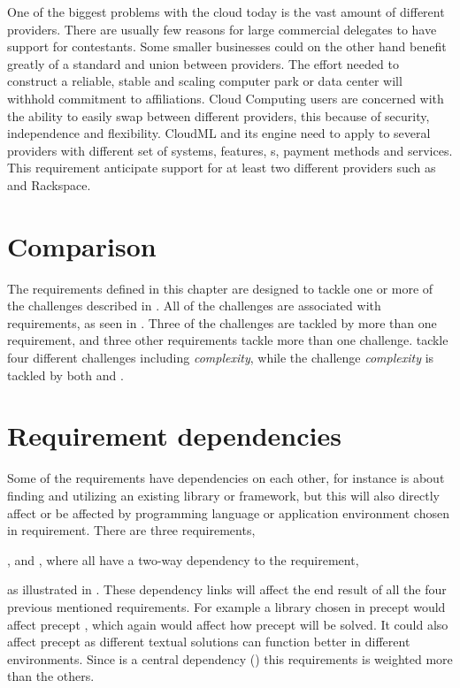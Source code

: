 One of the biggest problems with the cloud today is the vast amount of different providers. 
There are usually few reasons for large commercial delegates to have support for contestants. 
Some smaller businesses could on the other hand benefit greatly of a standard and union 
between providers.
The effort needed to construct a reliable, stable and scaling computer park or data center will 
withhold commitment to affiliations. 
Cloud Computing users are concerned with the ability to easily swap between different providers, 
this because of security, 
independence and flexibility. 
CloudML and its engine need to apply to several providers with different set of systems, 
features, s, payment methods and services. 
This requirement anticipate support for at least two different providers such as  and Rackspace.

\section{Comparison}


The requirements defined in this chapter are designed to tackle one or more of the challenges
described in .
All of the challenges are associated with requirements, as seen in .
Three of the challenges are tackled by more than one requirement, and three other requirements
tackle more than one challenge.
\eg {} tackle four different challenges including \emph{complexity},
while the challenge \emph{complexity} is tackled by both 
 and .

\section{Requirement dependencies}

Some of the requirements have dependencies on each other, for instance  is about finding
and utilizing an existing library or framework, but this will also directly affect or be affected by
programming language or application environment chosen in  requirement.
There are three requirements, 
\begin{ii}
  \iitem {},
  \iitem {} and
  \iitem {},
    where all have a two-way dependency to the 
  \iitem {} requirement,
\end{ii}
as illustrated in .
These dependency links will affect the end result of all the four previous mentioned requirements.
For example a library chosen in precept  would affect precept , which again would affect
how precept  will be solved. 
It could also affect precept  as different textual solutions can function better in
different environments.
Since  is a central dependency ()
this requirements is weighted more than the others.


